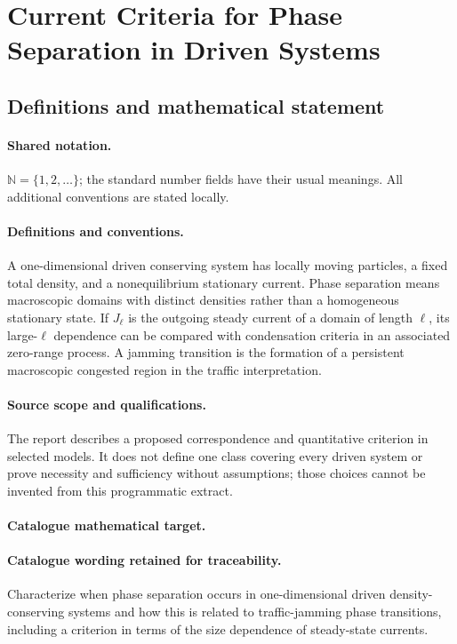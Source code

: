 \documentclass[11pt]{article}
\begin{document}
\section{Current Criteria for Phase Separation in Driven Systems}\label{statement}

\subsection{Definitions and mathematical statement}

\paragraph{Shared notation.}$\mathbb N=\{1,2,\ldots\}$; the standard number fields have their usual meanings. All additional conventions are stated locally.


\paragraph{Definitions and conventions.} A one-dimensional driven conserving system has locally moving particles, a fixed total density, and a nonequilibrium stationary current. Phase separation means macroscopic domains with distinct densities rather than a homogeneous stationary state. If $J_\ell$ is the outgoing steady current of a domain of length $\ell$, its large-$\ell$ dependence can be compared with condensation criteria in an associated zero-range process. A jamming transition is the formation of a persistent macroscopic congested region in the traffic interpretation.

\paragraph{Source scope and qualifications.} The report describes a proposed correspondence and quantitative criterion in selected models. It does not define one class covering every driven system or prove necessity and sufficiency without assumptions; those choices cannot be invented from this programmatic extract.

\paragraph{Catalogue mathematical target.}
\paragraph{Catalogue wording retained for traceability.}
Characterize when phase separation occurs in one-dimensional driven density-conserving systems and how this is related to traffic-jamming phase transitions, including a criterion in terms of the size dependence of steady-state currents.
\end{document}
